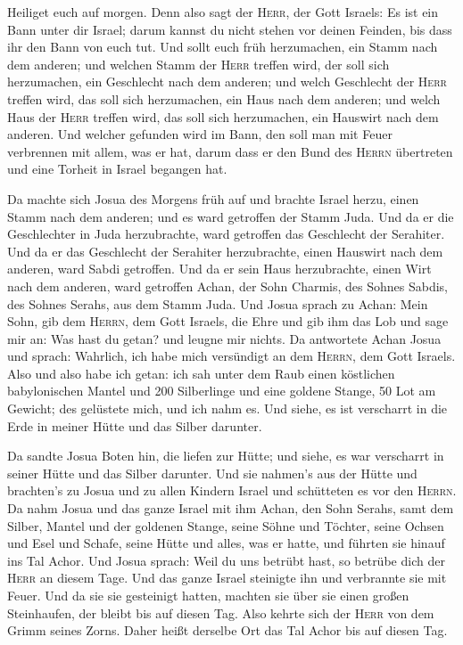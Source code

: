 Heiliget euch auf morgen. Denn also sagt der \textsc{Herr}, der Gott
Israels: Es ist ein Bann unter dir Israel; darum kannst du nicht stehen
vor deinen Feinden, bis dass ihr den Bann von euch tut. 
Und sollt euch früh herzumachen, ein Stamm nach dem anderen; und welchen
Stamm der \textsc{Herr} treffen wird, der soll sich herzumachen, ein
Geschlecht nach dem anderen; und welch Geschlecht der \textsc{Herr}
treffen wird, das soll sich herzumachen, ein Haus nach dem anderen; und
welch Haus der \textsc{Herr} treffen wird, das soll sich herzumachen,
ein Hauswirt nach dem anderen.  Und welcher gefunden wird
im Bann, den soll man mit Feuer verbrennen mit allem, was er hat, darum
dass er den Bund des \textsc{Herrn} übertreten und eine Torheit in
Israel begangen hat.

 Da machte sich Josua des Morgens früh auf und brachte
Israel herzu, einen Stamm nach dem anderen; und es ward getroffen der
Stamm Juda.  Und da er die Geschlechter in Juda
herzubrachte, ward getroffen das Geschlecht der Serahiter. Und da er das
Geschlecht der Serahiter herzubrachte, einen Hauswirt nach dem anderen,
ward Sabdi getroffen.  Und da er sein Haus herzubrachte,
einen Wirt nach dem anderen, ward getroffen Achan, der Sohn Charmis, des
Sohnes Sabdis, des Sohnes Serahs, aus dem Stamm Juda. 
Und Josua sprach zu Achan: Mein Sohn, gib dem \textsc{Herrn}, dem Gott
Israels, die Ehre und gib ihm das Lob und sage mir an: Was hast du
getan? und leugne mir nichts.  Da antwortete Achan Josua
und sprach: Wahrlich, ich habe mich versündigt an dem \textsc{Herrn},
dem Gott Israels. Also und also habe ich getan:  ich sah
unter dem Raub einen köstlichen babylonischen Mantel und 200 Silberlinge
und eine goldene Stange, 50 Lot am Gewicht; des gelüstete mich, und ich
nahm es. Und siehe, es ist verscharrt in die Erde in meiner Hütte und
das Silber darunter.

 Da sandte Josua Boten hin, die liefen zur Hütte; und
siehe, es war verscharrt in seiner Hütte und das Silber darunter.
 Und sie nahmen's aus der Hütte und brachten's zu Josua
und zu allen Kindern Israel und schütteten es vor den \textsc{Herrn}.
 Da nahm Josua und das ganze Israel mit ihm Achan, den
Sohn Serahs, samt dem Silber, Mantel und der goldenen Stange, seine
Söhne und Töchter, seine Ochsen und Esel und Schafe, seine Hütte und
alles, was er hatte, und führten sie hinauf ins Tal Achor.
 Und Josua sprach: Weil du uns betrübt hast, so betrübe
dich der \textsc{Herr} an diesem Tage. Und das ganze Israel steinigte
ihn und verbrannte sie mit Feuer. Und da sie sie gesteinigt hatten,
 machten sie über sie einen großen Steinhaufen, der
bleibt bis auf diesen Tag. Also kehrte sich der \textsc{Herr} von dem
Grimm seines Zorns. Daher heißt derselbe Ort das Tal Achor bis auf
diesen Tag.

